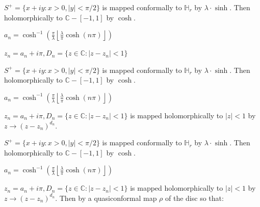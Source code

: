 \documentclass{beamer}
\begin{document}
\begin{frame} 

$S^+ = \{ x + iy : x > 0, |y| < \pi/2 \}$ is mapped conformally to $\mathbb{H}_r$ by $\lambda\cdot\sinh$. Then holomorphically to $\mathbb{C} - [-1,1]$ by $\cosh$.

\vspace{2.5mm}

$a_n = \cosh^{-1}\left( \frac{\pi}{\lambda} \left \lfloor{ \frac{\lambda}{\pi} \cosh(n\pi) }\right \rfloor \right)$

\vspace{2.5mm}

$z_n = a_n + i\pi, D_n = \{ z \in \mathbb{C} : \left| z - z_n \right| < 1\} $

\end{frame}



\begin{frame} 

$S^+ = \{ x + iy : x > 0, |y| < \pi/2 \}$ is mapped conformally to $\mathbb{H}_r$ by $\lambda\cdot\sinh$. Then holomorphically to $\mathbb{C} - [-1,1]$ by $\cosh$.

\vspace{2.5mm}

$a_n = \cosh^{-1}\left( \frac{\pi}{\lambda} \left \lfloor{ \frac{\lambda}{\pi} \cosh(n\pi) }\right \rfloor \right)$

\vspace{2.5mm}

$z_n = a_n + i\pi, D_n = \{ z \in \mathbb{C} : \left| z - z_n \right| < 1\} $ is mapped holomorphically to $|z|<1$ by $z\rightarrow (z - z_n)^{d_n}$.

\end{frame}






\begin{frame} 

$S^+ = \{ x + iy : x > 0, |y| < \pi/2 \}$ is mapped conformally to $\mathbb{H}_r$ by $\lambda\cdot\sinh$. Then holomorphically to $\mathbb{C} - [-1,1]$ by $\cosh$.

\vspace{2.5mm}

$a_n = \cosh^{-1}\left( \frac{\pi}{\lambda} \left \lfloor{ \frac{\lambda}{\pi} \cosh(n\pi) }\right \rfloor \right)$

\vspace{2.5mm}

$z_n = a_n + i\pi, D_n = \{ z \in \mathbb{C} : \left| z - z_n \right| < 1\} $ is mapped holomorphically to $|z|<1$ by $z\rightarrow (z - z_n)^{d_n}$. Then by a quasiconformal map $\rho$ of the disc so that: 

\end{frame}
\end{document}

